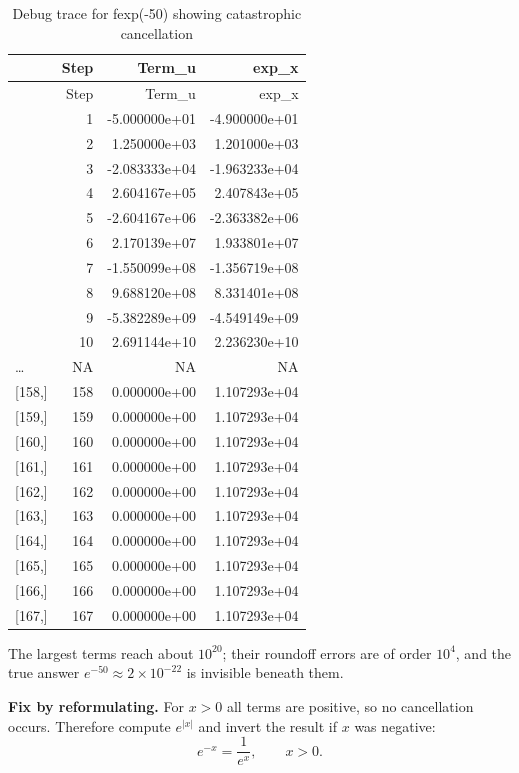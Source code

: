 \documentclass[
  letterpaper,
  DIV=11,
  numbers=noendperiod]{scrreprt}
\begin{document}
\begin{longtable}[]{@{}lrrr@{}}
\caption{Debug trace for fexp(-50) showing catastrophic
cancellation}\tabularnewline
\toprule\noalign{}
& Step & Term\_u & exp\_x \\
\midrule\noalign{}
\endfirsthead
\toprule\noalign{}
& Step & Term\_u & exp\_x \\
\midrule\noalign{}
\endhead
\bottomrule\noalign{}
\endlastfoot
& 1 & -5.000000e+01 & -4.900000e+01 \\
& 2 & 1.250000e+03 & 1.201000e+03 \\
& 3 & -2.083333e+04 & -1.963233e+04 \\
& 4 & 2.604167e+05 & 2.407843e+05 \\
& 5 & -2.604167e+06 & -2.363382e+06 \\
& 6 & 2.170139e+07 & 1.933801e+07 \\
& 7 & -1.550099e+08 & -1.356719e+08 \\
& 8 & 9.688120e+08 & 8.331401e+08 \\
& 9 & -5.382289e+09 & -4.549149e+09 \\
& 10 & 2.691144e+10 & 2.236230e+10 \\
\ldots{} & NA & NA & NA \\
{[}158,{]} & 158 & 0.000000e+00 & 1.107293e+04 \\
{[}159,{]} & 159 & 0.000000e+00 & 1.107293e+04 \\
{[}160,{]} & 160 & 0.000000e+00 & 1.107293e+04 \\
{[}161,{]} & 161 & 0.000000e+00 & 1.107293e+04 \\
{[}162,{]} & 162 & 0.000000e+00 & 1.107293e+04 \\
{[}163,{]} & 163 & 0.000000e+00 & 1.107293e+04 \\
{[}164,{]} & 164 & 0.000000e+00 & 1.107293e+04 \\
{[}165,{]} & 165 & 0.000000e+00 & 1.107293e+04 \\
{[}166,{]} & 166 & 0.000000e+00 & 1.107293e+04 \\
{[}167,{]} & 167 & 0.000000e+00 & 1.107293e+04 \\
\end{longtable}

The largest terms reach about \(10^{20}\); their roundoff errors are of
order \(10^{4}\), and the true answer \(e^{-50}\approx 2\times10^{-22}\)
is invisible beneath them.

\textbf{Fix by reformulating.} For \(x>0\) all terms are positive, so no
cancellation occurs. Therefore compute \(e^{|x|}\) and invert the result
if \(x\) was negative: \[
e^{-x} = \frac{1}{e^{x}}, \qquad x > 0 .
\]
\end{document}
